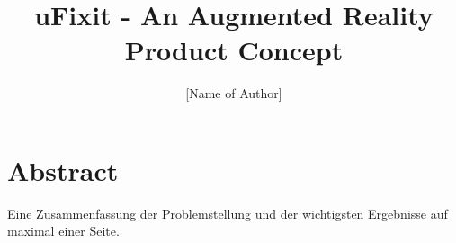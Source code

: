 \documentclass[doctype=Studienarbeit]{ldvbook}
\begin{document}
\title{uFixit - An Augmented Reality Product Concept}
\author{[Name of Author]}

\maketitle


\chapter*{Abstract}

Eine Zusammenfassung der Problemstellung und der wichtigsten
Ergebnisse auf maximal einer Seite.


\tableofcontents










\end{document}
